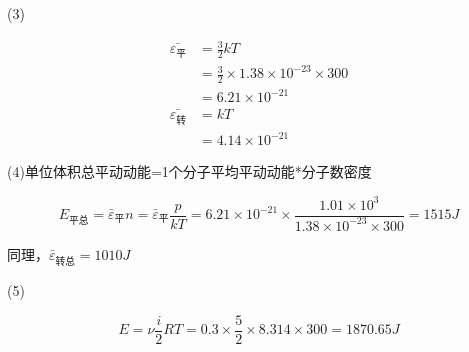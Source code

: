 \documentclass[b5paper,opensource]{./template/qyxf-book}
\begin{document}
(3)

\begin{align*}
\bar{\varepsilon_{\mbox{平}}}&=\frac{3}{2}kT\\
&=\frac{3}{2}\times 1.38\times 10^{-23}\times 300\\
&=6.21\times 10^{-21}\\
\bar{\varepsilon_{\mbox{转}}}&=kT\\
&=4.14\times 10^{-21}
\end{align*}

(4)单位体积总平动动能=1个分子平均平动动能*分子数密度

$$E_{\mbox{平总}}=\bar { \varepsilon } _ {\mbox{平}}n=\bar { \varepsilon } _ {\mbox{平}}\frac{p}{kT}=6.21 \times 10 ^ { - 21 } \times \frac { 1.01 \times 10 ^ { 3 } } { 1.38 \times 10 ^ { - 23 } \times 300 } = 1515 J$$

同理，$\bar { \varepsilon } _ {\mbox{转总}}=1010J$

(5)

$$
E = \nu \frac { i } { 2 } R T = 0.3 \times \frac { 5 } { 2 } \times 8.314 \times 300 = 1870.65 J
$$
\end{document}
